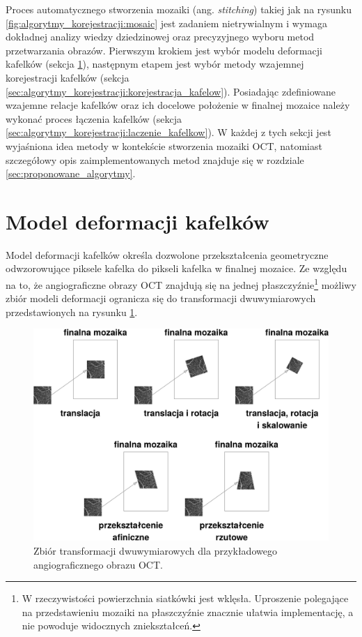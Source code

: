 Proces automatycznego stworzenia mozaiki (ang. \textit{stitching}) takiej jak na rysunku \ref{fig:algorytmy_korejestracji:mosaic} jest zadaniem nietrywialnym i wymaga dokładnej analizy wiedzy dziedzinowej oraz precyzyjnego wyboru metod przetwarzania obrazów. Pierwszym krokiem jest wybór modelu deformacji kafelków (sekcja \ref{sec:algorytmy_korejestracji:model_deformacji}), następnym etapem jest wybór metody wzajemnej korejestracji kafelków (sekcja \ref{sec:algorytmy_korejestracji:korejestracja_kafelow}). Posiadając zdefiniowane wzajemne relacje kafelków oraz ich docelowe położenie w finalnej mozaice należy wykonać proces łączenia kafelków (sekcja \ref{sec:algorytmy_korejestracji:laczenie_kafelkow}). W każdej z tych sekcji jest wyjaśniona idea metody w kontekście stworzenia mozaiki OCT, natomiast szczegółowy opis zaimplementowanych metod znajduje się w rozdziale \ref{sec:proponowane_algorytmy}.

\section{Model deformacji kafelków}
\label{sec:algorytmy_korejestracji:model_deformacji}

Model deformacji kafelków określa dozwolone przekształcenia geometryczne odwzorowujące piksele kafelka do pikseli kafelka w finalnej mozaice. Ze względu na to, że angiograficzne obrazy OCT znajdują się na jednej płaszczyźnie\footnote{W rzeczywistości powierzchnia siatkówki jest wklęsła. Uproszenie polegające na przedstawieniu mozaiki na płaszczyźnie znacznie ułatwia implementację, a nie powoduje widocznych zniekształceń.} możliwy zbiór modeli deformacji ogranicza  się do transformacji dwuwymiarowych przedstawionych na rysunku \ref{fig:algorytmy_korejestracji:trans}.

\begin{figure}[H]
  \centering
  \includegraphics[width=\textwidth]{gfx/trans}
  \caption{Zbiór transformacji dwuwymiarowych dla przykładowego angiograficznego obrazu OCT.}
  \label{fig:algorytmy_korejestracji:trans}
\end{figure}

